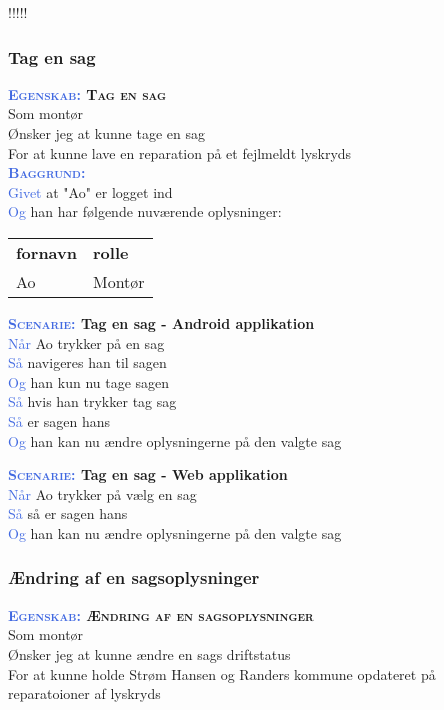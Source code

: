 !!!!!

\subsubsection{Tag en sag}
\textbf{\textsc{\textcolor{RoyalBlue}{Egenskab:} Tag en sag}}\\
Som montør\\
Ønsker jeg at kunne tage en sag\\
For at kunne lave en reparation på et fejlmeldt lyskryds\\

\textsc{\textcolor{RoyalBlue}{\textbf{Baggrund:}}}\\
\textcolor{RoyalBlue}{Givet} at "Ao" er logget ind\\
\textcolor{RoyalBlue}{Og} han har følgende nuværende oplysninger:\\
\begin{tabular}{| l | l |}
	\textbf{fornavn} & \textbf{rolle} \\
	Ao & Montør\\
\end{tabular}
\newline \newline

\textbf{\textsc{\textcolor{RoyalBlue}{Scenarie:}} Tag en sag - Android applikation}\\
\textcolor{RoyalBlue}{Når} Ao trykker på en sag\\
\textcolor{RoyalBlue}{Så} navigeres han til sagen\\
\textcolor{RoyalBlue}{Og} han kun nu tage sagen\\
\textcolor{RoyalBlue}{Så} hvis han trykker tag sag\\
\textcolor{RoyalBlue}{Så} er sagen hans\\
\textcolor{RoyalBlue}{Og} han kan nu ændre oplysningerne på den valgte sag\\
\clearpage

\textbf{\textsc{\textcolor{RoyalBlue}{Scenarie:}} Tag en sag - Web applikation}\\
\textcolor{RoyalBlue}{Når} Ao trykker på vælg en sag\\
\textcolor{RoyalBlue}{Så} så er sagen hans\\
\textcolor{RoyalBlue}{Og} han kan nu ændre oplysningerne på den valgte sag\\

\subsubsection{Ændring af en sagsoplysninger}\label{sec:USRedigerSag}
\textbf{\textsc{\textcolor{RoyalBlue}{Egenskab:} Ændring af en sagsoplysninger}}\\
Som montør\\
Ønsker jeg at kunne ændre en sags driftstatus\\
For at kunne holde Strøm Hansen og Randers kommune opdateret på reparatoioner af lyskryds\\

